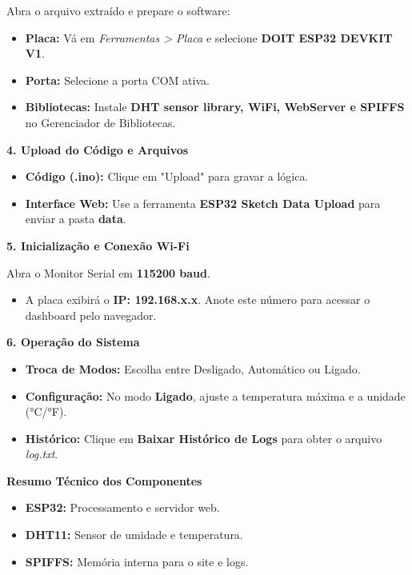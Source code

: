 Abra o arquivo extraído e prepare o software:
\begin{itemize}
    \item \textbf{Placa:} Vá em \textit{Ferramentas > Placa} e selecione \textbf{DOIT ESP32 DEVKIT V1}.
    \item \textbf{Porta:} Selecione a porta COM ativa.
    \item \textbf{Bibliotecas:} Instale \textbf{DHT sensor library, WiFi, WebServer e SPIFFS} no Gerenciador de Bibliotecas.
\end{itemize}

\textbf{\large 4. Upload do Código e Arquivos} 
\begin{itemize}
    \item \textbf{Código (.ino):} Clique em "Upload" 
    para gravar a lógica.
    \item \textbf{Interface Web:} Use a ferramenta \textbf{ESP32 Sketch Data Upload} para enviar a pasta \textbf{data}.
\end{itemize}


\textbf{\large 5. Inicialização e Conexão Wi-Fi} 

Abra o Monitor Serial em \textbf{115200 baud}.
\begin{itemize}
    \item A placa exibirá o \textbf{IP: 192.168.x.x}. Anote este número para acessar o dashboard pelo navegador.
\end{itemize}


\textbf{\large 6. Operação do Sistema} 
\begin{itemize}
    \item \textbf{Troca de Modos:} Escolha entre Desligado, Automático ou Ligado.
    \item \textbf{Configuração:} No modo \textbf{Ligado}, ajuste a temperatura máxima e a unidade (°C/°F).
    \item \textbf{Histórico:} Clique em \textbf{Baixar Histórico de Logs} para obter o arquivo \textit{log.txt}.
\end{itemize}

\vspace{1cm}

\textbf{\large Resumo Técnico dos Componentes} 
\begin{itemize}
    \item \textbf{ESP32:} Processamento e servidor web.
    \item \textbf{DHT11:} Sensor de umidade e temperatura.
    \item \textbf{SPIFFS:} Memória interna para o site e logs.
\end{itemize}